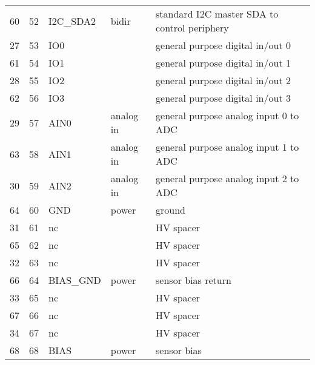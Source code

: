 \begin{table}[p]
{\begin{tabular}{cclll}
60 & 52 & I2C\_SDA2 & bidir & standard I2C master SDA to control periphery \\ 
27 & 53 & IO0 &  & general purpose digital in/out 0 \\ 
61 & 54 & IO1 &  & general purpose digital in/out 1 \\ 
28 & 55 & IO2 &  & general purpose digital in/out 2 \\ 
62 & 56 & IO3 &  & general purpose digital in/out 3 \\ 
29 & 57 & AIN0 & analog in & general purpose analog input 0 to ADC \\ 
63 & 58 & AIN1 & analog in & general purpose analog input 1 to ADC \\ 
30 & 59 & AIN2 & analog in & general purpose analog input 2 to ADC \\ 
64 & 60 & GND & power & ground \\ 
31 & 61 & nc &  & HV spacer \\ 
65 & 62 & nc &  & HV spacer \\ 
32 & 63 & nc &  & HV spacer \\ 
66 & 64 & BIAS\_GND & power & sensor bias return \\ 
33 & 65 & nc &  & HV spacer \\ 
67 & 66 & nc &  & HV spacer \\ 
34 & 67 & nc &  & HV spacer \\ 
68 & 68 & BIAS & power & sensor bias \\ 
\bottomrule
\end{tabular}
}
\label{ROCmoduleInterfaceConnector}
\end{table}


